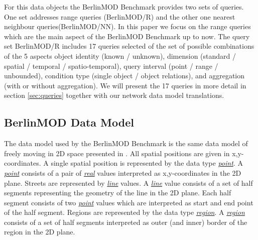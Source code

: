 \documentclass[a4paper]{article}
\newcommand{\bmodb} {BerlinMOD Benchmark}
\newcommand{\dt}[1]{\textsl{\underline{#1}}}
\begin{document}
For this data objects the \bmodb{} provides two sets of queries. One set addresses range queries (BerlinMOD/R) and the  other one nearest neighbour queries(BerlinMOD/NN). In this paper we focus on the range queries which are the main aspect of the \bmodb{} up to now. The query set BerlinMOD/R includes 17 queries selected of the set of possible combinations of the 5 aspects object identity (known / unknown), dimension (standard / spatial / temporal / spatio-temporal), query interval (point / range / unbounded), condition type (single object / object relations), and aggregation (with or without aggregation). We will present the 17 queries in more detail in section \ref{sec:queries} together with our network data model translations.
\subsection{BerlinMOD Data Model}
\label{sec:bmodbdatamod}
The data model used by the \bmodb{} is the same data model of freely moving in 2D space presented in \cite{594784,335426,352963}. All spatial positions are given in x,y-coordinates. A single spatial position is represented by the data type \dt{point}. A \dt{point} consists of a pair of \dt{real} values interpreted as x,y-coordinates in the 2D plane. Streets are represented by \dt{line} values. A \dt{line} value consists of a set of half segments representing the geometry of the line in the 2D plane. Each half segment consists of two \dt{point} values which are interpreted as start and end point of the half segment. Regions are represented by the data type \dt{region}. A \dt{region} consists of a set of half segments interpreted as outer (and inner) border of the region in the 2D plane.
\end{document}
